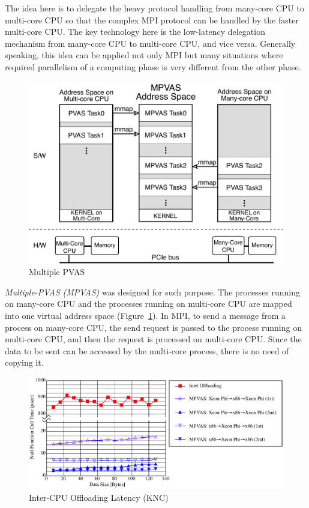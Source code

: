 The idea here is to delegate the heavy protocol handling from
many-core CPU to multi-core CPU so that the complex MPI protocol can
be handled by the faster multi-core CPU. The key technology here is
the low-latency delegation mechanism from many-core CPU to multi-core 
CPU, and vice versa. Generally speaking, this idea can be applied not
only MPI but many situations where required parallelism of a
computing phase is very different from the other phase.

\begin{figure}[ht]
\begin{center}
\includegraphics[width=0.75\columnwidth]{Figs/MPVAS.pdf}
  \caption{Multiple PVAS}
  \label{fig:mpvas}
\end{center}
\end{figure}

{\em Multiple-PVAS (MPVAS)} was designed for such purpose. The
processes running on many-core CPU and the processes running on
multi-core CPU are mapped into one virtual address space
(Figure~\ref{fig:mpvas})\cite{fukazawa-thesis}. In MPI, to 
send a message from a process on many-core CPU, the send request is
passed to the process running on multi-core CPU, and then the request
is processed on multi-core CPU. Since the data to be sent can be
accessed by the multi-core process, there is no need of copying it. 

\begin{figure}[ht]
\begin{center}
\includegraphics[width=0.95\columnwidth]{Figs/MPVAS-TAT.pdf}
  \caption{Inter-CPU Offloading Latency (KNC)}
  \label{fig:mpvas-tat}
\end{center}
\end{figure}

